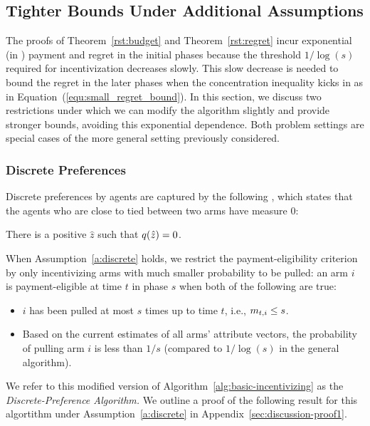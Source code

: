 \subsection{Tighter Bounds Under Additional Assumptions}

The proofs of Theorem~\ref{rst:budget} and Theorem~\ref{rst:regret}
incur exponential (in \ARMNUM) payment and regret in the initial
phases because the threshold $1/\log(s)$ required for incentivization
decreases slowly. 
This slow decrease is needed to bound the regret in the later phases
when the concentration inequality kicks in as in
Equation~(\ref{equ:small_regret_bound}).
In this section, we discuss two restrictions under which we can
modify the algorithm slightly and provide stronger bounds,
avoiding this exponential dependence.
Both problem settings are special cases of the more general
setting previously considered. 

\subsubsection{Discrete Preferences}
\label{subsec:discrete}
Discrete preferences by agents are captured by the following
,
which states that the agents who are close to tied between
two arms have measure 0:

\begin{assumption}
\label{a:discrete}
There is a positive $\hat{z}$ such that
$q(\hat{z}) = 0$.
\end{assumption}

When Assumption~\ref{a:discrete} holds,
we restrict the payment-eligibility criterion by only incentivizing
arms with much smaller probability to be pulled:
an arm $i$ is payment-eligible at time $t$ in phase $s$ when both of
the following are true: 

\begin{itemize}
\item $i$ has been pulled at most $s$ times up to time $t$,
i.e., $m_{t,i} \leq s$.
\item Based on the current estimates  of all arms' attribute vectors,
the probability of pulling arm $i$ is less than $1/s$
(compared to $1/\log(s)$ in the general algorithm).
\end{itemize}

We refer to this modified version of
Algorithm~\ref{alg:basic-incentivizing} as the
\emph{Discrete-Preference Algorithm.}
We outline a proof of the following result for this algortithm under
Assumption~\ref{a:discrete} in Appendix~\ref{sec:discussion-proof1}.

